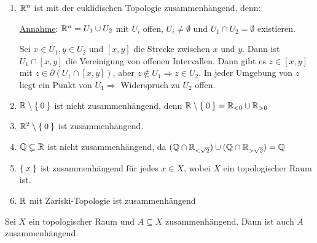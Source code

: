 \begin{beispiel}
    \begin{enumerate}[label=\arabic*)]
        \item $\mathbb{R}^n$ ist mit der euklidischen Topologie zusammenhängend,
            denn:

            \underline{Annahme}: $\mathbb{R}^n = U_1 \cup U_2$ mit $U_i$ 
            offen, $U_i \neq \emptyset$ und $U_1 \cap U_2 = \emptyset$ 
            existieren.

            Sei $x \in U_1, y \in U_2$ und $[x,y]$ die Strecke zwischen $x$
            und $y$. Dann ist $U_1 \cap [x,y]$ die Vereinigung von offenen
            Intervallen. Dann gibt es $z \in [x,y]$ mit $z \in \partial (U_1 \cap [x,y])$,
            aber $z \notin U_1 \Rightarrow z \in U_2$. In jeder Umgebung von 
            $z$ liegt ein Punkt von $U_1 \Rightarrow$ Widerspruch zu $U_2$ offen.
        \item $\mathbb{R} \setminus \Set{0}$ ist nicht zusammenhängend, denn
              $\mathbb{R} \setminus \Set{0} = \mathbb{R}_{< 0} \cup \mathbb{R}_{> 0}$
        \item $\mathbb{R}^2 \setminus \Set{0}$ ist zusammenhängend.
        \item $\mathbb{Q} \subsetneq \mathbb{R}$ ist nicht zusammenhängend, da 
              $(\mathbb{Q} \cap \mathbb{R}_{< \sqrt{2}}) \cup (\mathbb{Q} \cap \mathbb{R}_{> \sqrt{2}}) = \mathbb{Q}$
        \item $\Set{x}$ ist zusammenhängend für jedes $x \in X$, 
              wobei $X$ ein topologischer Raum ist.
        \item $\mathbb{R}$ mit Zariski-Topologie ist zusammenhängend
    \end{enumerate}
\end{beispiel}

\begin{bemerkung}\label{zusammenhangAbschluss}
    Sei $X$ ein topologischer Raum und $A \subseteq X$ zusammenhängend.
    Dann ist auch $\overline{A}$ zusammenhängend.
\end{bemerkung}

